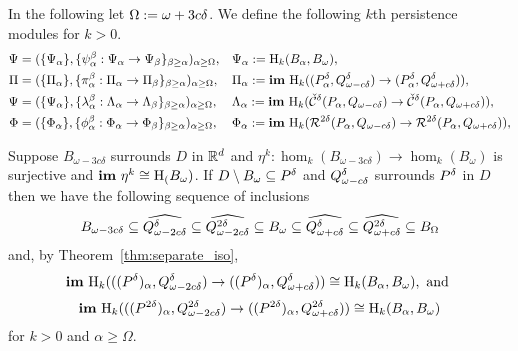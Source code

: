 
In the following let $\Omega := \ome + 3c\of$.
We define the following $k$th persistence modules for $k > 0$.
\begin{align*}
  \Psi &= (\{\Psi_\alpha\}, \{\psi_\alpha^\beta : \Psi_\alpha\to \Psi_\beta\}_{\beta\geq \alpha})_{\alpha\geq\Omega}, & &\Psi_\alpha := \hom_k(B_\alpha, \B),\\
  \Pi &= (\{\Pi_\alpha\}, \{\pi_\alpha^\beta : \Pi_\alpha\to \Pi_\beta\}_{\beta\geq \alpha})_{\alpha\geq\Omega}, & &\Pi_\alpha := \im~\hom_k((\P_\alpha, \Q^\of)\to (\P_\alpha, \QQ^\of)),\\
  \Psi &= (\{\Psi_\alpha\}, \{\lambda_\alpha^\beta : \Lambda_\alpha\to \Lambda_\beta\}_{\beta\geq \alpha})_{\alpha\geq\Omega}, & &\Lambda_\alpha := \im~\hom_k(\cech^\delta(P_\alpha, \Q)\to \cech^\delta(P_\alpha, \QQ)),\\
  \Phi &= (\{\Phi_\alpha\}, \{\phi_\alpha^\beta : \Phi_\alpha\to \Phi_\beta\}_{\beta\geq \alpha})_{\alpha\geq\Omega}, & &\Phi_\alpha := \im~\hom_k(\rips^{2\delta}(P_\alpha, \Q)\to \rips^{2\delta}(P_\alpha, \QQ)),
\end{align*}

Suppose $B_{\omega - 3c\delta}$ surrounds $D$ in $\R^d$ and $\eta^k : \hom_k(B_{\omega-3c\delta})\to \hom_k(B_\omega)$ is surjective and $\im~\eta^k\cong \hom_(B_\omega)$.
If $D\setminus\B\subseteq\P$ and $\Q^\of$ surrounds $\P$ in $D$ then we have the following sequence of inclusions
\[ B_{\omega - 3c\delta}\subseteq \widehat{Q_{\omega-2c\delta}^\delta}\subseteq \widehat{Q_{\omega-2c\delta}^{2\delta}}\subseteq \B\subseteq \widehat{\QQ^\delta}\subseteq\widehat{\QQ^{2\delta}}\subseteq B_{\Omega}\]
and, by Theorem~\ref{thm:separate_iso},
\[\im~\hom_k(((\P)_\alpha,Q_{\omega-2c\delta}^\of)\to ((\P)_\alpha,\QQ^\of))\cong\hom_k(B_\alpha, B_\omega),\text{ and }\]
\[\im~\hom_k(((P^{2\delta})_\alpha,Q_{\omega-2c\delta}^{2\of})\to ((P^{2\of})_\alpha,\QQ^{2\of}))\cong\hom_k(B_\alpha, B_\omega)\]
for $k > 0$ and $\alpha\geq\Omega$.
